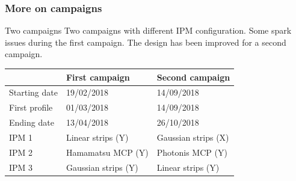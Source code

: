\begin{frame}[t]
  \frametitle{More on campaigns}
  \begin{block}{Two campaigns}
    Two campaigns with different IPM configuration. Some spark issues during the first campaign. The design has been improved for a second campaign.
  \end{block}
  \begin{tabularx}{\linewidth}{XXX}
    \toprule
                  & First campaign      & Second campaign     \\
    \midrule
    Starting date & 19/02/2018          & 14/09/2018          \\
    First profile & 01/03/2018          & 14/09/2018          \\
    Ending date   & 13/04/2018          & 26/10/2018          \\
    IPM 1         & Linear strips (Y)   & Gaussian strips (X) \\
    IPM 2         & Hamamatsu MCP (Y)   & Photonis MCP (Y)    \\
    IPM 3         & Gaussian strips (Y) & Linear strips (Y)   \\
    \bottomrule
  \end{tabularx}
  \begin{columns}[T]
    \begin{column}{0.45\textwidth}
    \end{column}
    \begin{column}{0.45\textwidth}
    \end{column}
  \end{columns}
\end{frame}

